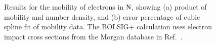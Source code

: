 \documentclass{warpdoc}
\let\citen\cite
\begin{document}
%
\begin{figure}
\centering
{}
\caption{Results for the mobility of electrons in ${\rm N}$, showing (a) product of mobility and number density, and (b) error percentage of cubic spline fit of  mobility data. The BOLSIG+ calculation uses electron impact cross sections from the Morgan database in Ref.\ \citen{jcp:2012:morgan}.}
\label{fig:mobility_N}
\end{figure}
\end{document}
